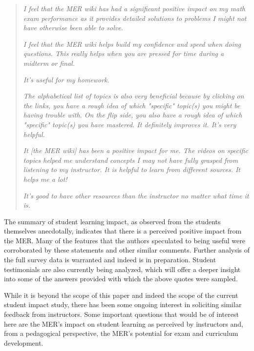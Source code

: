 \documentclass{primus}
\begin{document}
\begin{quote}
\textit{I feel that the MER wiki has had a significant positive impact on my math exam performance as it provides detailed solutions to problems I might not have otherwise been able to solve.}

\textit{I feel that the MER wiki helps build my confidence and speed when doing questions. This really helps when you are pressed for time during a midterm or final.}

\textit{It's useful for my homework.}

\textit{The alphabetical list of topics is also very beneficial because by clicking on the links, you have a rough idea of which "specific" topic(s) you might be having trouble with. On the flip side, you also have a rough idea of which "specific" topic(s) you have mastered. It definitely improves it. It’s very helpful.}

\textit{It [the MER wiki] has been a positive impact for me. The videos on specific topics helped me understand concepts I may not have fully grasped from listening to my instructor. It is helpful to learn from different sources. It helps me a lot!}

\textit{It's good to have other resources than the instructor no matter what time it is.}
\end{quote}

\noindent{}The summary of student learning impact, as observed from the students themselves anecdotally, indicates that there is a perceived positive impact from the MER. Many of the features that the authors speculated to being useful were corroborated by these statements and other similar comments. Further analysis of the full survey data is warranted and indeed is in preparation. Student testimonials are also currently being analyzed, which will offer a deeper insight into some of the answers provided with which the above quotes were sampled.

\noindent While it is beyond the scope of this paper and indeed the scope of the current student impact study, there has been some ongoing interest in soliciting similar feedback from instructors.  Some important questions that would be of interest here are the MER’s impact on student learning as perceived by instructors and, from a pedagogical perspective, the MER’s potential for exam and curriculum development.
\end{document}
